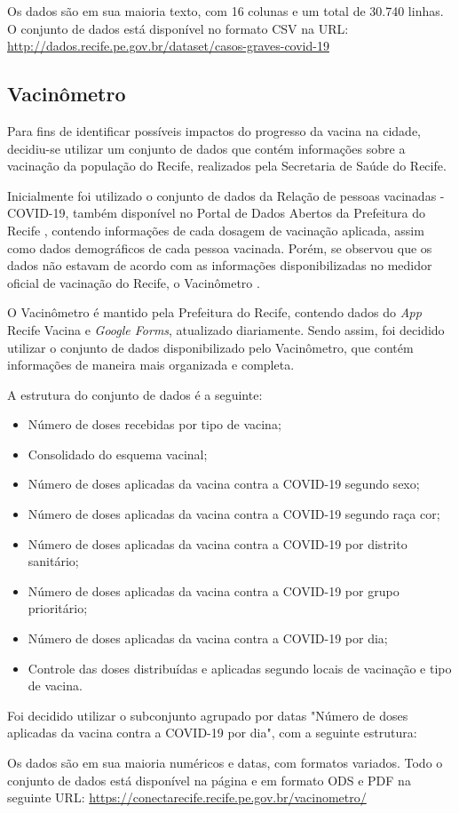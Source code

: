 Os dados são em sua maioria texto, com 16 colunas e um total de 30.740 linhas.
O conjunto de dados está disponível no formato CSV na URL: 
\url{http://dados.recife.pe.gov.br/dataset/casos-graves-covid-19}




\subsection{Vacinômetro}
\label{subsec:vacinacao}

Para fins de identificar possíveis impactos do progresso da vacina na cidade, decidiu-se utilizar um conjunto de dados que contém informações sobre a vacinação da população do Recife, realizados pela Secretaria de Saúde do Recife.

Inicialmente foi utilizado o conjunto de dados da Relação de pessoas vacinadas - COVID-19, também disponível no Portal de Dados Abertos da Prefeitura do Recife \cite{vacinacao-relacao}, contendo informações de cada dosagem de vacinação aplicada, assim como dados demográficos de cada pessoa vacinada. 
Porém, se observou que os dados não estavam de acordo com as informações disponibilizadas no medidor oficial de vacinação do Recife, o Vacinômetro \cite{vacinometro}.

O Vacinômetro é mantido pela Prefeitura do Recife, contendo dados do \textit{App} Recife Vacina e \textit{Google Forms}, atualizado diariamente.
Sendo assim, foi decidido utilizar o conjunto de dados disponibilizado pelo Vacinômetro, que contém informações de maneira mais organizada e completa. 

A estrutura do conjunto de dados é a seguinte:

\begin{itemize}
  \item Número de doses recebidas por tipo de vacina;
  \item Consolidado do esquema vacinal;
  \item Número de doses aplicadas da vacina contra a COVID-19 segundo sexo;
  \item Número de doses aplicadas da vacina contra a COVID-19 segundo raça cor;
  \item Número de doses aplicadas da vacina contra a COVID-19 por distrito sanitário;
  \item Número de doses aplicadas da vacina contra a COVID-19 por grupo prioritário;
  \item Número de doses aplicadas da vacina contra a COVID-19 por dia;
  \item Controle das doses distribuídas e aplicadas segundo locais de vacinação e tipo de vacina.
\end{itemize}

Foi decidido utilizar o subconjunto agrupado por datas "Número de doses aplicadas da vacina contra a COVID-19 por dia", com a seguinte estrutura:



Os dados são em sua maioria numéricos e datas, com formatos variados. 
Todo o conjunto de dados está disponível na página e em formato ODS e PDF na seguinte URL: 
\url{https://conectarecife.recife.pe.gov.br/vacinometro/}